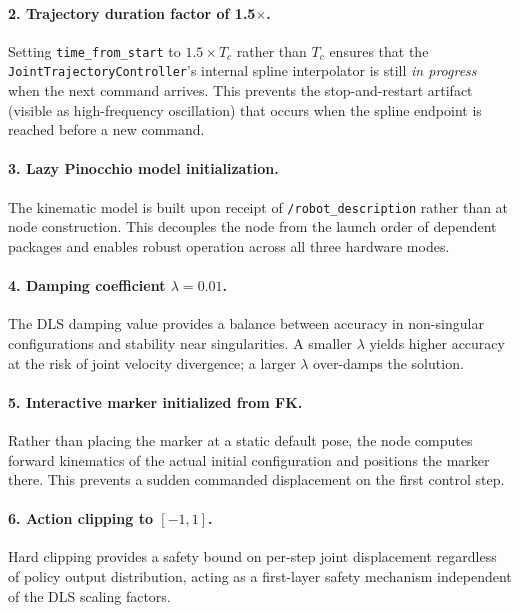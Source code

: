 \documentclass[12pt, a4paper]{article}
\begin{document}
\paragraph{2. Trajectory duration factor of 1.5$\times$.}
Setting \texttt{time\_from\_start} to $1.5 \times T_c$ rather than $T_c$ ensures
that the \texttt{JointTrajectoryController}'s internal spline interpolator is still
\emph{in progress} when the next command arrives. This prevents the stop-and-restart
artifact (visible as high-frequency oscillation) that occurs when the spline endpoint
is reached before a new command.

\paragraph{3. Lazy Pinocchio model initialization.}
The kinematic model is built upon receipt of \texttt{/robot\_description} rather
than at node construction. This decouples the node from the launch order of dependent
packages and enables robust operation across all three hardware modes.

\paragraph{4. Damping coefficient $\lambda = 0.01$.}
The DLS damping value provides a balance between accuracy in non-singular
configurations and stability near singularities. A smaller $\lambda$ yields higher
accuracy at the risk of joint velocity divergence; a larger $\lambda$ over-damps
the solution.

\paragraph{5. Interactive marker initialized from FK.}
Rather than placing the marker at a static default pose, the node computes forward
kinematics of the actual initial configuration and positions the marker there. This
prevents a sudden commanded displacement on the first control step.

\paragraph{6. Action clipping to $[-1, 1]$.}
Hard clipping provides a safety bound on per-step joint displacement regardless
of policy output distribution, acting as a first-layer safety mechanism independent
of the DLS scaling factors.

\end{document}
